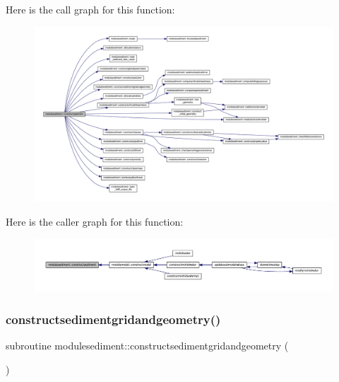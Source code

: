 Here is the call graph for this function\+:\nopagebreak
\begin{figure}[H]
\begin{center}
\leavevmode
\includegraphics[width=350pt]{namespacemodulesediment_a1a3b01f7483f6fefc6f2dac6a51d664c_cgraph}
\end{center}
\end{figure}
Here is the caller graph for this function\+:\nopagebreak
\begin{figure}[H]
\begin{center}
\leavevmode
\includegraphics[width=350pt]{namespacemodulesediment_a1a3b01f7483f6fefc6f2dac6a51d664c_icgraph}
\end{center}
\end{figure}
\mbox{\label{namespacemodulesediment_a4fcfee70467ab31177134369a945bf94}} 
\subsubsection{\texorpdfstring{constructsedimentgridandgeometry()}{constructsedimentgridandgeometry()}}
{\footnotesize\ttfamily subroutine modulesediment\+::constructsedimentgridandgeometry (\begin{DoxyParamCaption}{ }\end{DoxyParamCaption})\hspace{0.3cm}{\ttfamily [private]}}

